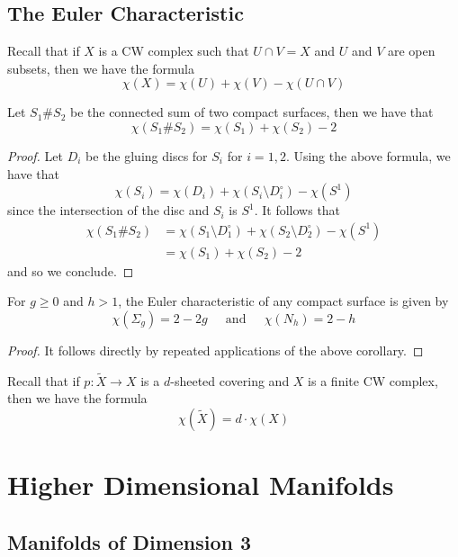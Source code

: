 \documentclass[a4paper]{article}
\begin{document}
\subsection{The Euler Characteristic}
Recall that if $X$ is a CW complex such that $U\cap V=X$ and $U$ and $V$ are open subsets, then we have the formula $$\chi(X)=\chi(U)+\chi(V)-\chi(U\cap V)$$

\begin{crl}{}{} Let $S_1\# S_2$ be the connected sum of two compact surfaces, then we have that $$\chi(S_1\# S_2)=\chi(S_1)+\chi(S_2)-2$$ \tcbline
\begin{proof}
Let $D_i$ be the gluing discs for $S_i$ for $i=1,2$. Using the above formula, we have that $$\chi(S_i)=\chi(D_i)+\chi(S_i\setminus D_i^\circ)-\chi(S^1)$$ since the intersection of the disc and $S_i$ is $S^1$. It follows that 
\begin{align*}
\chi(S_1\# S_2)&=\chi(S_1\setminus D_1^\circ)+\chi(S_2\setminus D_2^\circ)-\chi(S^1)\\
&=\chi(S_1)+\chi(S_2)-2
\end{align*}
and so we conclude. 
\end{proof}
\end{crl}

\begin{crl}{}{} For $g\geq 0$ and $h>1$, the Euler characteristic of any compact surface is given by $$\chi(\Sigma_g)=2-2g\;\;\;\;\text{ and }\;\;\;\;\chi(N_h)=2-h$$ \tcbline
\begin{proof}
It follows directly by repeated applications of the above corollary. 
\end{proof}
\end{crl}

Recall that if $p:\widetilde{X}\to X$ is a $d$-sheeted covering and $X$ is a finite CW complex, then we have the formula $$\chi(\widetilde{X})=d\cdot\chi(X)$$

\pagebreak
\section{Higher Dimensional Manifolds}
\subsection{Manifolds of Dimension 3}
\begin{thm}{}{}
\end{thm}
\end{document}
